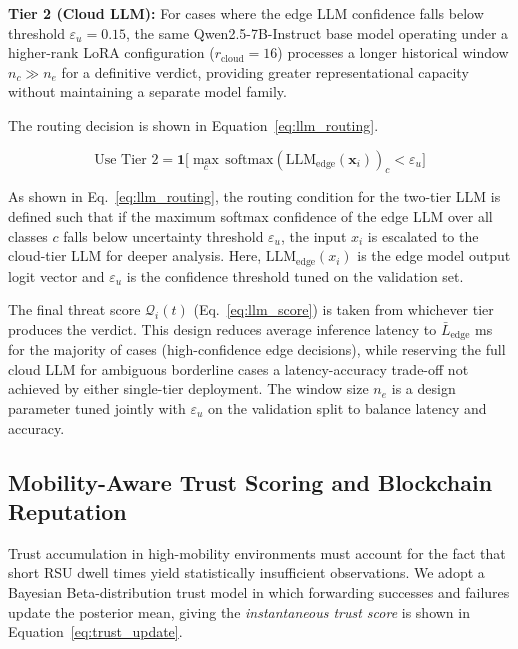 \documentclass[12pt, a4paper]{report}
\begin{document}
\textbf{Tier 2 (Cloud LLM):} For cases where the edge LLM
confidence falls below threshold $\varepsilon_u = 0.15$, the
same Qwen2.5-7B-Instruct base model operating under a
higher-rank LoRA configuration ($r_{\text{cloud}}=16$) processes
a longer historical window $n_c \gg n_e$ for a definitive
verdict, providing greater representational capacity without
maintaining a separate model family.

The routing decision is shown in Equation~\eqref{eq:llm_routing}.

\begin{equation}
\label{eq:llm_routing}
\text{Use Tier 2} =
\mathbf{1}\bigl[
\max_c \,\mathrm{softmax}(\mathrm{LLM}_{\mathrm{edge}}(\mathbf{x}_i))_c < \varepsilon_u
\bigr]
\end{equation}

As shown in Eq.~\eqref{eq:llm_routing}, the routing condition for the two-tier LLM is defined such that if the maximum softmax confidence of the edge LLM over all classes $c$ falls below uncertainty threshold $\varepsilon_u$, the input $x_i$ is escalated to the cloud-tier LLM for deeper analysis. Here, $\text{LLM}_{\text{edge}}(x_i)$ is the edge model output logit vector and $\varepsilon_u$ is the confidence threshold tuned on the validation set.



The final threat score $\mathcal{Q}_i(t)$ (Eq.~\eqref{eq:llm_score}) is
taken from whichever tier produces the verdict. This design reduces average
inference latency to $\bar{L}_{\mathrm{edge}}$ ms for the majority of cases
(high-confidence edge decisions), while reserving the full cloud LLM for
ambiguous borderline cases a latency-accuracy trade-off not achieved by
either single-tier deployment. The window size $n_e$ is a design parameter
tuned jointly with $\varepsilon_u$ on the validation split to balance
latency and accuracy.

\subsection{Mobility-Aware Trust Scoring and Blockchain Reputation}

Trust accumulation in high-mobility environments must account for the fact that
short RSU dwell times yield statistically insufficient observations. We adopt a
Bayesian Beta-distribution trust model in which forwarding successes and failures
update the posterior mean, giving the \emph{instantaneous trust score} is shown in Equation~\eqref{eq:trust_update}.
\end{document}
